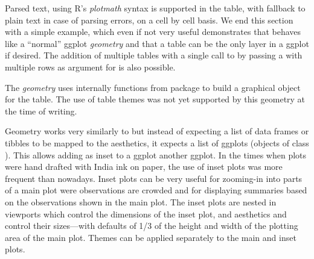 \documentclass[krantz2]{krantz}\usepackage{knitr}%
\begin{document}
Parsed text, using R's \emph{plotmath} syntax is supported in the table, with fallback to plain text in case of parsing errors, on a cell by cell basis. We end this section with a simple example, which even if not very useful demonstrates that  behaves like a ``normal'' ggplot \emph{geometry} and that a table can be the only layer in a ggplot if desired. The addition of multiple tables with a single call to  by passing a  with multiple rows as argument for  is also possible.

\begin{knitrout}\footnotesize
{}\color{fgcolor}\begin{kframe}
\begin{alltt}
 \hlkwb{<-} \hlstd{(} \hlstd{=} \hlstd{,}
                 \hlstd{=} \hlopt{:}\hlstd{,}
                 \hlstd{= (}\hlopt{:}\hlstd{)}\hlopt{^}\hlstd{,}
                 \hlstd{= (}\hlopt{:}\hlstd{)}\hlopt{^}\hlstd{)}
 \hlkwb{<-} \hlstd{(} \hlstd{=} \hlstd{,}  \hlstd{=} \hlstd{,}  \hlstd{=} 
  \hlstd{=}    \hlopt{+}
  \hlstd{(} \hlstd{=} \hlstd{,}  \hlstd{=} \hlstd{,}  \hlstd{=} \hlstd{)} \hlopt{+}
  \hlstd{()}
\end{alltt}
\end{kframe}
\end{knitrout}

\begin{explainbox}
  The \emph{geometry}  uses internally functions from package  to build a graphical object for the table. The use of table themes was not yet supported by this geometry at the time of writing.
\end{explainbox}

Geometry  works very similarly to  but instead of expecting a list of data frames or tibbles to be mapped to the  aesthetics, it expects a list of ggplots (objects of class ). This allows adding as inset to a ggplot another ggplot. In the times when plots were hand drafted with India ink on paper, the use of inset plots was more frequent than nowadays. Inset plots can be very useful for zooming-in into parts of a main plot were observations are crowded and for displaying summaries based on the observations shown in the main plot. The inset plots are nested in viewports which control the dimensions of the inset plot, and aesthetics  and  control their sizes---with defaults of 1/3 of the height and width of the plotting area of the main plot. Themes can be applied separately to the main and inset plots.
\end{document}
